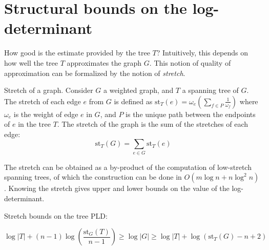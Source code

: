 
\section{Structural bounds on the log-determinant}

How good is the estimate provided by the tree $T$? Intuitively, this
depends on how well the tree $T$ approximates the graph $G$. This
notion of quality of approximation can be formalized by the notion
of \emph{stretch}. \begin{definition} Stretch of a graph. Consider
$G$ a weighted graph, and $T$ a spanning tree of $G$. The stretch
of each edge $e$ from $G$ is defined as $\text{st}_{T}\left(e\right)=\omega_{e}\left(\sum_{f\in P}\frac{1}{\omega_{f}}\right)$
where $\omega_{e}$ is the weight of edge $e$ in $G$, and $P$ is
the unique path between the endpoints of $e$ in the tree $T$. The
stretch of the graph is the sum of the stretches of each edge: 
\[
\text{st}_{T}\left(G\right)=\sum_{e\in G}\text{st}_{T}\left(e\right)
\]


\end{definition} The stretch can be obtained as a by-product of the
computation of low-stretch spanning trees, of which the construction
can be done in $O\left(m\log n+n\log^{2}n\right)$ \cite{Abraham2008}.
Knowing the stretch gives upper and lower bounds on the value of the
log-determinant. \begin{proposition} Stretch bounds on the tree PLD:
\end{proposition} 
\begin{equation}
\log\left|T\right|+\left(n-1\right)\log\left(\frac{\text{st}_{G}\left(T\right)}{n-1}\right)\geq\log\left|G\right|\geq\log\left|T\right|+\log\left(\text{st}_{T}\left(G\right)-n+2\right)\label{eq:encadrement}
\end{equation}


